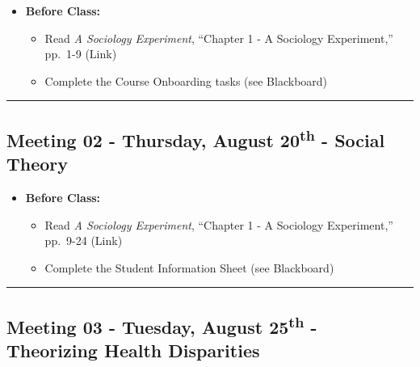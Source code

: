 \documentclass[
]{book}
\providecommand{\tightlist}{%
  \setlength{\itemsep}{0pt}\setlength{\parskip}{0pt}}
\begin{document}
\begin{itemize}
\tightlist
\item
  \textbf{Before Class:}

  \begin{itemize}
  \tightlist
  \item
    Read \emph{A Sociology Experiment}, ``Chapter 1 - A Sociology Experiment,'' pp.~1-9 (Link)
  \item
    Complete the Course Onboarding tasks (see Blackboard)
  \end{itemize}
\end{itemize}

\begin{center}\rule{0.5\linewidth}{0.5pt}\end{center}

\hypertarget{meeting-02---thursday-august-20th---social-theory}{%
\subsection*{\texorpdfstring{Meeting 02 - Thursday, August 20\textsuperscript{th} - Social Theory}{Meeting 02 - Thursday, August 20th - Social Theory}}\label{meeting-02---thursday-august-20th---social-theory}}

\begin{itemize}
\tightlist
\item
  \textbf{Before Class:}

  \begin{itemize}
  \tightlist
  \item
    Read \emph{A Sociology Experiment}, ``Chapter 1 - A Sociology Experiment,'' pp.~9-24 (Link)
  \item
    Complete the Student Information Sheet (see Blackboard)
  \end{itemize}
\end{itemize}

\begin{center}\rule{0.5\linewidth}{0.5pt}\end{center}

\hypertarget{meeting-03---tuesday-august-25th---theorizing-health-disparities}{%
\subsection*{\texorpdfstring{Meeting 03 - Tuesday, August 25\textsuperscript{th} - Theorizing Health Disparities}{Meeting 03 - Tuesday, August 25th - Theorizing Health Disparities}}\label{meeting-03---tuesday-august-25th---theorizing-health-disparities}}
\end{document}
